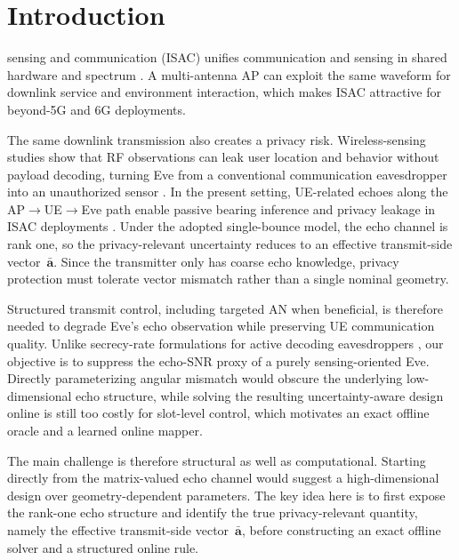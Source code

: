 \documentclass[journal]{IEEEtran}
\begin{document}
\section{Introduction}
 sensing and communication (ISAC) unifies communication and sensing in shared hardware and spectrum \cite{liu2023integrated,giordani2020toward}. A multi-antenna AP can exploit the same waveform for downlink service and environment interaction, which makes ISAC attractive for beyond-5G and 6G deployments.

The same downlink transmission also creates a privacy risk. Wireless-sensing studies show that RF observations can leak user location and behavior without payload decoding, turning Eve from a conventional communication eavesdropper into an unauthorized sensor \cite{zhu2018adversarial}. In the present setting, UE-related echoes along the AP$\rightarrow$UE$\rightarrow$Eve path enable passive bearing inference and privacy leakage in ISAC deployments \cite{zhou2022aoa,da2023multi,ren2024secure}. Under the adopted single-bounce model, the echo channel is rank one, so the privacy-relevant uncertainty reduces to an effective transmit-side vector~$\bar{\mathbf{a}}$. Since the transmitter only has coarse echo knowledge, privacy protection must tolerate vector mismatch rather than a single nominal geometry.

Structured transmit control, including targeted AN when beneficial, is therefore needed to degrade Eve's echo observation while preserving UE communication quality. Unlike secrecy-rate formulations for active decoding eavesdroppers \cite{khisti2010secure,goel2008guaranteeing}, our objective is to suppress the echo-SNR proxy of a purely sensing-oriented Eve. Directly parameterizing angular mismatch would obscure the underlying low-dimensional echo structure, while solving the resulting uncertainty-aware design online is still too costly for slot-level control, which motivates an exact offline oracle and a learned online mapper.

The main challenge is therefore structural as well as computational. Starting directly from the matrix-valued echo channel would suggest a high-dimensional design over geometry-dependent parameters. The key idea here is to first expose the rank-one echo structure and identify the true privacy-relevant quantity, namely the effective transmit-side vector~$\bar{\mathbf{a}}$, before constructing an exact offline solver and a structured online rule.
\end{document}

